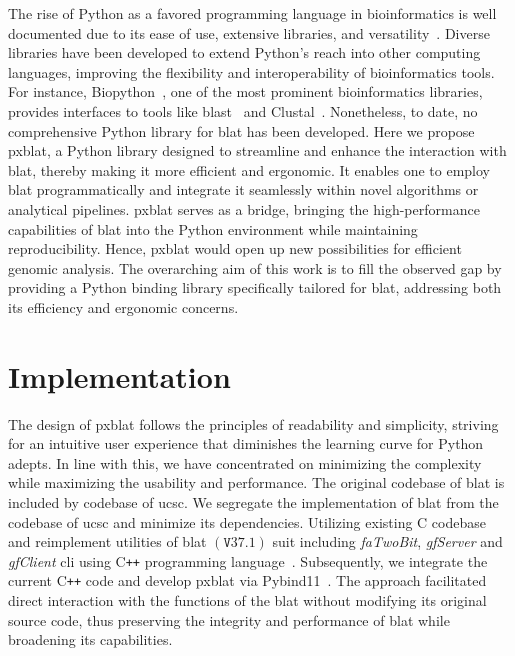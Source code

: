 The rise of Python as a favored programming language in bioinformatics is well documented due to its ease of use, extensive libraries, and versatility~\citep{perkel2015programming}.
Diverse libraries have been developed to extend Python's reach into other computing languages, improving the flexibility and interoperability of bioinformatics tools.
For instance, Biopython~\citep{cock2009biopython}, one of the most prominent bioinformatics libraries, provides interfaces to tools like \gls{blast}~\citep{altschul1990basic} and Clustal~\citep{higgins1988clustal}.
Nonetheless, to date, no comprehensive Python library for \gls{blat} has been developed.
Here we propose \gls{pxblat}, a Python library designed to streamline and enhance the interaction with \gls{blat}, thereby making it more efficient and ergonomic.
It enables one to employ \gls{blat} programmatically and integrate it  seamlessly within novel algorithms or analytical pipelines.
\gls{pxblat} serves as a bridge, bringing the high-performance capabilities of \gls{blat} into the Python environment while maintaining reproducibility.
Hence, \gls{pxblat} would open up new possibilities for efficient genomic analysis.
The overarching aim of this work is to fill the observed gap by providing a Python binding library specifically tailored for \gls{blat}, addressing both its efficiency and ergonomic concerns.

\section*{Implementation}\label{sec:implementation}

The design of \gls{pxblat} follows the principles of readability and simplicity, striving for an intuitive user experience that diminishes the learning curve for Python adepts.
In line with this, we have concentrated on minimizing the complexity while maximizing the usability and performance.
The original codebase of \gls{blat} is included by codebase of \gls{ucsc}.
We segregate the implementation of \gls{blat} from the codebase of \gls{ucsc} and minimize its dependencies.
Utilizing existing C codebase and reimplement utilities of \gls{blat} \(\left(\mathtt{V}37.1\right)\) suit  including \emph{faTwoBit}, \emph{gfServer} and \emph{gfClient} \gls{cli} using C\texttt{++} programming language~\citep{kent2002blat}.
Subsequently, we integrate the current C\texttt{++} code and develop \gls{pxblat} via Pybind11~\citep{pybind11}.
The approach facilitated direct interaction with the functions of the \gls{blat} without modifying its original source code, thus preserving the integrity and performance of \gls{blat} while broadening its capabilities.

